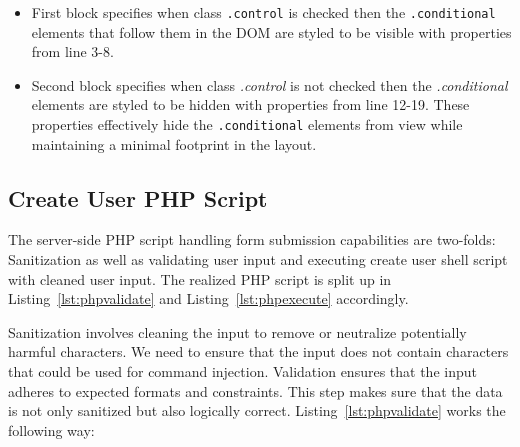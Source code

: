 \begin{itemize}
    \item First block specifies when class \texttt{.control} is checked then the
    \texttt{.conditional} elements that follow them in the DOM are styled to be
    visible with properties from line 3-8. 
    \item Second block specifies when class \textit{.control} is not checked
    then the \textit{.conditional} elements are styled to be hidden with
    properties from line 12-19. These properties effectively hide the
    \texttt{.conditional} elements from view while maintaining a minimal
    footprint in the
    layout.
\end{itemize}



\subsection{Create User PHP Script}

The server-side PHP script handling form submission capabilities are two-folds:
Sanitization as well as validating user input and executing create user shell
script with cleaned user input. The realized PHP script is split up in
Listing~\ref{lst:phpvalidate} and Listing~\ref{lst:phpexecute} accordingly.

Sanitization involves cleaning the input to remove or neutralize potentially
harmful characters. We need to ensure that the input does not contain characters
that could be used for command injection. Validation ensures that the input
adheres to expected formats and constraints. This step makes sure that the data
is not only sanitized but also logically correct. Listing~\ref{lst:phpvalidate}
works the following way:

